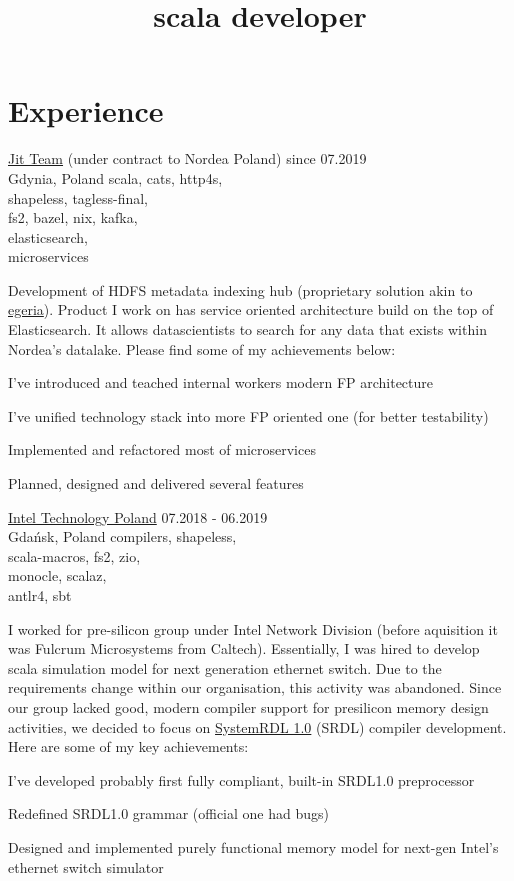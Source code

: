 \documentclass[a4paper,11pt]{cv4tw}%
\title{scala developer}
\begin{document}
\section{Experience}
      {\href{https://www.jit.team}{Jit Team} (under contract to Nordea Poland)}
      {since 07.2019\\Gdynia, Poland}
      {scala, cats, http4s,\\shapeless, tagless-final,\\fs2, bazel, nix, kafka,\\elasticsearch,\\microservices
      }
      {Development of HDFS metadata indexing hub (proprietary solution akin to \href{https://egeria.odpi.org}{egeria}).
        Product I work on has service oriented architecture build on the top of
        Elasticsearch. It allows datascientists to search for any data that exists
        within Nordea's datalake.
        Please find some of my achievements below:
        \begin{missions}
        \item I've introduced and teached internal workers modern FP architecture
        \item I've unified technology stack into more FP oriented one (for better testability)
        \item Implemented and refactored most of microservices
        \item Planned, designed and delivered several features
        \end{missions}
      }
      {\href{https://www.intel.com/content/www/us/en/jobs/locations/poland.html}{Intel Technology Poland}}
      {07.2018 - 06.2019\\Gdańsk, Poland}
      {compilers, shapeless,\\scala-macros, fs2, zio,\\monocle, scalaz,\\antlr4, sbt}
      {I worked for pre-silicon group under Intel Network Division (before aquisition it was Fulcrum Microsystems from Caltech).
        Essentially, I was hired to develop scala simulation model for next generation ethernet switch.
        Due to the requirements change within our organisation, this activity was abandoned.
        Since our group lacked good, modern compiler support for presilicon memory design activities, we decided to focus on
        \href{https://www.accellera.org/downloads/standards/systemrdl}{SystemRDL 1.0} (SRDL) compiler development.
        Here are some of my key achievements:
        \begin{missions}
        \item I've developed probably first fully compliant, built-in SRDL1.0 preprocessor
        \item Redefined SRDL1.0 grammar (official one had bugs)
        \item Designed and implemented purely functional memory model for next-gen Intel's ethernet switch simulator
        \end{missions}
      }
\end{document}
